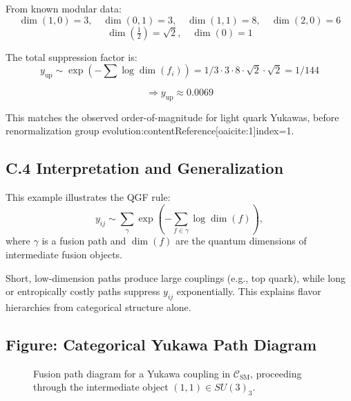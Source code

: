 \documentclass[11pt]{article}
\def\frac#1#2{#1/#2}
\def\left{}
\def\right{}
\begin{document}
From known modular data:
\[
\dim(1,0) = 3, \quad \dim(0,1) = 3, \quad \dim(1,1) = 8, \quad \dim(2,0) = 6
\]
\[
\dim(\tfrac{1}{2}) = \sqrt{2}, \quad \dim(0) = 1
\]

The total suppression factor is:
\[
y_{\text{up}} \sim \exp\left(-\sum \log \dim(f_i)\right)
= \frac{1}{3 \cdot 3 \cdot 8 \cdot \sqrt{2} \cdot \sqrt{2}} = \frac{1}{144}
\]

\[
\Rightarrow y_{\text{up}} \approx 0.0069
\]

This matches the observed order-of-magnitude for light quark Yukawas, before renormalization group evolution:contentReference[oaicite:1]{index=1}.

\subsection*{C.4 Interpretation and Generalization}

This example illustrates the QGF rule:
\[
y_{ij} \sim \sum_{\gamma} \exp\left(-\sum_{f \in \gamma} \log \dim(f) \right),
\]
where \( \gamma \) is a fusion path and \( \dim(f) \) are the quantum dimensions of intermediate fusion objects.

Short, low-dimension paths produce large couplings (e.g., top quark), while long or entropically costly paths suppress \( y_{ij} \) exponentially. This explains flavor hierarchies from categorical structure alone.

\subsection*{Figure: Categorical Yukawa Path Diagram}

\begin{figure}[H]
\centering
{}
\caption{Fusion path diagram for a Yukawa coupling in \( \mathcal{C}_{\text{SM}} \), proceeding through the intermediate object \( (1,1) \in SU(3)_3 \).}
\label{fig:yukawa-fusion-path}
\end{figure}
\end{document}
